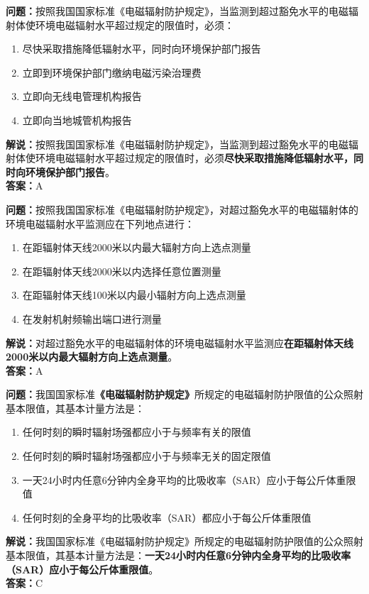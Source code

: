 \bigskip


\noindent\textbf{问题：}按照我国国家标准《电磁辐射防护规定》，当监测到超过豁免水平的电磁辐射体使环境电磁辐射水平超过规定的限值时，必须：
\begin{enumerate}[label=\Alph*), leftmargin=3em]
	\item 尽快采取措施降低辐射水平，同时向环境保护部门报告
	\item 立即到环境保护部门缴纳电磁污染治理费
	\item 立即向无线电管理机构报告
	\item 立即向当地城管机构报告
\end{enumerate}
\noindent\textbf{解说：}按照我国国家标准《电磁辐射防护规定》，当监测到超过豁免水平的电磁辐射体使环境电磁辐射水平超过规定的限值时，必须\textbf{尽快采取措施降低辐射水平，同时向环境保护部门报告}。\\
\textbf{答案：}A

\bigskip


\noindent\textbf{问题：}按照我国国家标准《电磁辐射防护规定》，对超过豁免水平的电磁辐射体的环境电磁辐射水平监测应在下列地点进行：
\begin{enumerate}[label=\Alph*), leftmargin=3em]
	\item 在距辐射体天线2000米以内最大辐射方向上选点测量
	\item 在距辐射体天线2000米以内选择任意位置测量
	\item 在距辐射体天线100米以内最小辐射方向上选点测量
	\item 在发射机射频输出端口进行测量
\end{enumerate}
\noindent\textbf{解说：}对超过豁免水平的电磁辐射体的环境电磁辐射水平监测应\textbf{在距辐射体天线2000米以内最大辐射方向上选点测量}。\\
\textbf{答案：}A

\bigskip


\noindent\textbf{问题：}我国国家标准\textbf{《电磁辐射防护规定》}所规定的电磁辐射防护限值的公众照射基本限值，其基本计量方法是：
\begin{enumerate}[label=\Alph*), leftmargin=3em]
	\item 任何时刻的瞬时辐射场强都应小于与频率有关的限值
	\item 任何时刻的瞬时辐射场强都应小于与频率无关的固定限值
	\item 一天24小时内任意6分钟内全身平均的比吸收率（SAR）应小于每公斤体重限值
	\item 任何时刻的全身平均的比吸收率（SAR）都应小于每公斤体重限值
\end{enumerate}
\noindent\textbf{解说：}我国国家标准《电磁辐射防护规定》所规定的电磁辐射防护限值的公众照射基本限值，其基本计量方法是：\textbf{一天24小时内任意6分钟内全身平均的比吸收率（SAR）应小于每公斤体重限值}。\\
\textbf{答案：}C


